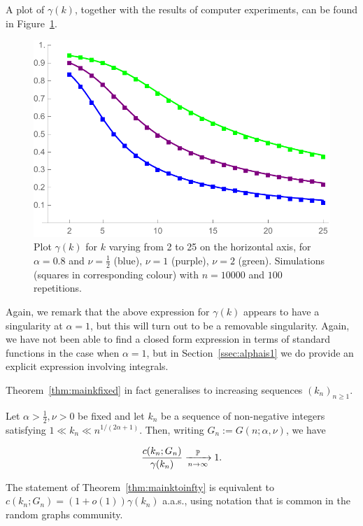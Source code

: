 \noindent
A plot of $\gamma(k)$,  together with the results of computer experiments, can be found in Figure~\ref{fig:gammak}. %
%
%
\begin{figure}[ht]
    \centering
    \includegraphics[scale=0.6]{figures/ckn10000a08nu0512rep100k2to25Squares.pdf}
    \caption{Plot $\gamma(k)$ for $k$ varying from 2 to 25 on the horizontal axis, for $\alpha=0.8$ and $\nu=\frac{1}{2}$ 
    (blue), $\nu=1$ (purple), $\nu=2$ (green). Simulations (squares in corresponding colour) with $n=10000$ and $100$ repetitions.\label{fig:gammak}}
\end{figure}%
%
Again, we remark that the above expression for $\gamma(k)$ appears to have a singularity at $\alpha=1$, but this will turn out to be a removable singularity. 
Again, we have not been able to find a closed form expression in terms of standard functions in the case when $\alpha=1$, but in 
Section~\ref{ssec:alphais1} we do provide an explicit expression involving integrals.

Theorem~\ref{thm:mainkfixed} in fact generalises to increasing sequences $(k_n)_{n \ge 1}$.

\begin{theorem}\label{thm:mainktoinfty}
Let $\alpha>\frac12, \nu>0$ be fixed and let $k_n$ be a sequence of non-negative integers
satisfying $1 \ll k_n \ll n^{1/(2\alpha+1)}$. Then, writing $G_n := G(n;\alpha,\nu)$, we have

$$ \frac{c(k_n;G_n)}{\gamma(k_n)} \xrightarrow[n\to\infty]{\mathbb{P}} 1. $$ 

\end{theorem}

\noindent
The statement of Theorem~\ref{thm:mainktoinfty} is equivalent to $c(k_n;G_n) = (1+o(1)) \gamma(k_n)$ a.a.s., using notation that is common in the random graphs community. %


